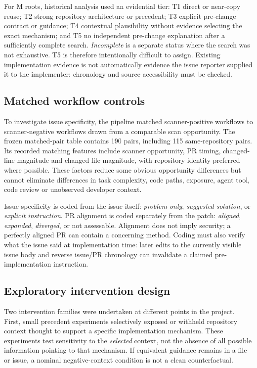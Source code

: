 \documentclass[journal,10pt,twoside]{IEEEtran}
\begin{document}
For M roots, historical analysis used an evidential tier: T1 direct or near-copy reuse; T2 strong repository architecture or precedent; T3 explicit pre-change contract or guidance; T4 contextual plausibility without evidence selecting the exact mechanism; and T5 no independent pre-change explanation after a sufficiently complete search. \emph{Incomplete} is a separate status where the search was not exhaustive. T5 is therefore intentionally difficult to assign. Existing implementation evidence is not automatically evidence the issue reporter supplied it to the implementer: chronology and source accessibility must be checked.

\subsection{Matched workflow controls}
To investigate issue specificity, the pipeline matched scanner-positive workflows to scanner-negative workflows drawn from a comparable scan opportunity. The frozen matched-pair table contains 190 pairs, including 115 same-repository pairs. Its recorded matching features include scanner opportunity, PR timing, changed-line magnitude and changed-file magnitude, with repository identity preferred where possible. These factors reduce some obvious opportunity differences but cannot eliminate differences in task complexity, code paths, exposure, agent tool, code review or unobserved developer context.

Issue specificity is coded from the issue itself: \emph{problem only}, \emph{suggested solution}, or \emph{explicit instruction}. PR alignment is coded separately from the patch: \emph{aligned}, \emph{expanded}, \emph{diverged}, or not assessable. Alignment does not imply security; a perfectly aligned PR can contain a concerning method. Coding must also verify what the issue said at implementation time: later edits to the currently visible issue body and reverse issue/PR chronology can invalidate a claimed pre-implementation instruction.

\subsection{Exploratory intervention design}
Two intervention families were undertaken at different points in the project. First, small precedent experiments selectively exposed or withheld repository context thought to support a specific implementation mechanism. These experiments test sensitivity to the \emph{selected} context, not the absence of all possible information pointing to that mechanism. If equivalent guidance remains in a file or issue, a nominal negative-context condition is not a clean counterfactual.
\end{document}
